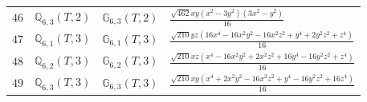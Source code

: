 \documentclass[fleqn,8pt,landscape]{jsarticle}
\begin{document}
\begin{table}[ht!]
\begin{center}
\begin{tabular}{cccl}
$ 46 $ & $ \mathbb{Q}_{6,3}(T,2) $ & $ \mathbb{G}_{6,3}(T,2) $ & $ \frac{\sqrt{462} x y \left(x^{2} - 3 y^{2}\right) \left(3 x^{2} - y^{2}\right)}{16} $ \\
$ 47 $ & $ \mathbb{Q}_{6,1}(T,3) $ & $ \mathbb{G}_{6,1}(T,3) $ & $ \frac{\sqrt{210} y z \left(16 x^{4} - 16 x^{2} y^{2} - 16 x^{2} z^{2} + y^{4} + 2 y^{2} z^{2} + z^{4}\right)}{16} $ \\
$ 48 $ & $ \mathbb{Q}_{6,2}(T,3) $ & $ \mathbb{G}_{6,2}(T,3) $ & $ \frac{\sqrt{210} x z \left(x^{4} - 16 x^{2} y^{2} + 2 x^{2} z^{2} + 16 y^{4} - 16 y^{2} z^{2} + z^{4}\right)}{16} $ \\
$ 49 $ & $ \mathbb{Q}_{6,3}(T,3) $ & $ \mathbb{G}_{6,3}(T,3) $ & $ \frac{\sqrt{210} x y \left(x^{4} + 2 x^{2} y^{2} - 16 x^{2} z^{2} + y^{4} - 16 y^{2} z^{2} + 16 z^{4}\right)}{16} $ \\
 \hline \hline
\end{tabular}
\end{center}
\end{table}
\end{document}
